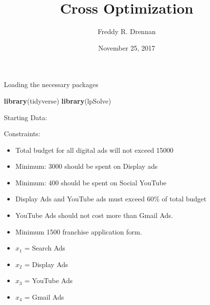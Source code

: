 \documentclass[]{article}
\title{Cross Optimization}
\author{Freddy R. Drennan}
\date{November 25, 2017}
\newenvironment{Shaded}{\begin{snugshade}}{\end{snugshade}}
\newcommand{\KeywordTok}[1]{\textcolor[rgb]{0.13,0.29,0.53}{\textbf{#1}}}
\newcommand{\DataTypeTok}[1]{\textcolor[rgb]{0.13,0.29,0.53}{#1}}
\newcommand{\DecValTok}[1]{\textcolor[rgb]{0.00,0.00,0.81}{#1}}
\newcommand{\StringTok}[1]{\textcolor[rgb]{0.31,0.60,0.02}{#1}}
\newcommand{\CommentTok}[1]{\textcolor[rgb]{0.56,0.35,0.01}{\textit{#1}}}
\newcommand{\OperatorTok}[1]{\textcolor[rgb]{0.81,0.36,0.00}{\textbf{#1}}}
\newcommand{\NormalTok}[1]{#1}
\begin{document}
\maketitle

Loading the necessary packages

\begin{Shaded}
\begin{Highlighting}[]
\KeywordTok{library}\NormalTok{(tidyverse)}
\KeywordTok{library}\NormalTok{(lpSolve)}
\end{Highlighting}
\end{Shaded}

Starting Data:

\begin{Shaded}
\end{Shaded}

Constraints:

\begin{itemize}
\item
  Total budget for all digital ads will not exceed 15000
\item
  Minimum: 3000 should be spent on Display ads
\item
  Minimum: 400 should be spent on Social YouTube
\item
  Display Ads and YouTube ads must exceed 60\% of total budget
\item
  YouTube Ads should not cost more than Gmail Ads.
\item
  Minimum 1500 franchise application form.
\item
  \(x_1\) = Search Ads
\item
  \(x_2\) = Display Ads
\item
  \(x_3\) = YouTube Ads
\item
  \(x_4\) = Gmail Ads
\end{itemize}
\end{document}

